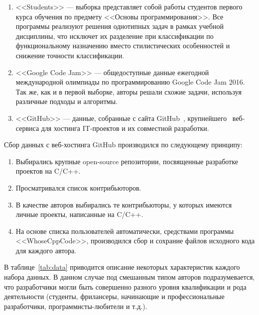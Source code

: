 \begin{enumerate}
 \item <<Students>> --- выборка представляет собой работы студентов первого курса обучения по 
 предмету <<Основы программирования>>. Все программы реализуют решения однотипных задач в рамках учебной 
 дисциплины, что исключет их разделение при классификации по функциональному назначению вместо 
 стилистических особенностей и снижение точности классификации. 
 \item <<Google Code Jam>> --- общедоступные данные ежегодной международной олимпиады по программированию Google Code Jam 
 2016.~\cite{GoogleCodeJam} Так же, как и в первой выборке, авторы решали схожие задачи, используя различные
 подходы и алгоритмы. 
\item <<GitHub>> --- данные, собранные с сайта GitHub~\cite{GitHub}, крупнейшего~\cite{GH_domain} 
веб-сервиса для хостинга IT-проектов и их совместной разработки. 
\end{enumerate}


Сбор данных с веб-хостинга GitHub производился по следующему принципу: 
\begin{enumerate}
 \item Выбирались крупные open-source репозитории,  
 посвященные разработке проектов на C/C++.
 \item Просматривался список контрибьюторов.
 \item В качестве авторов выбирались те контрибьюторы, у которых имеются личные проекты, написанные 
 на C/C++.
 \item На основе списка пользователей автоматически, средствами программы <<WhoseCppCode>>, производился
 сбор и сохрание файлов исходного кода для каждого автора. 
\end{enumerate}

В таблице~\ref{tab:data} приводится описание некоторых характеристик каждого набора данных.
В данном случае под смешанным типом авторов подразумевается, что разработчики могли быть совершенно
разного уровня квалификации и рода деятельности (студенты, фрилансеры, начинающие и 
профессиональные разработчики, программисты-любители и т.д.).

